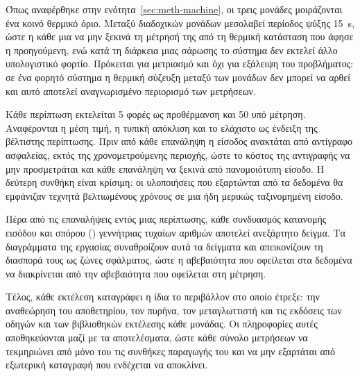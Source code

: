 Όπως αναφέρθηκε στην ενότητα~\ref{sec:meth-machine}, οι τρεις μονάδες μοιράζονται
ένα κοινό θερμικό όριο. Μεταξύ διαδοχικών μονάδων μεσολαβεί περίοδος ψύξης
\qty{15}{\second}, ώστε η κάθε μια να μην ξεκινά τη μέτρησή της από τη θερμική
κατάσταση που άφησε η προηγούμενη, ενώ κατά τη διάρκεια μιας σάρωσης το σύστημα
δεν εκτελεί άλλο υπολογιστικό φορτίο. Πρόκειται για μετριασμό και όχι για
εξάλειψη του προβλήματος: σε ένα φορητό σύστημα η θερμική σύζευξη μεταξύ των
μονάδων δεν μπορεί να αρθεί και αυτό αποτελεί αναγνωρισμένο περιορισμό των
μετρήσεων.

Κάθε περίπτωση εκτελείται 5 φορές ως προθέρμανση και 50 υπό μέτρηση. Αναφέρονται
η μέση τιμή, η τυπική απόκλιση και το ελάχιστο ως ένδειξη της βέλτιστης
περίπτωσης. Πριν από κάθε επανάληψη η είσοδος ανακτάται από αντίγραφο ασφαλείας,
εκτός της χρονομετρούμενης περιοχής, ώστε το κόστος της αντιγραφής να μην
προσμετράται και κάθε επανάληψη να ξεκινά από πανομοιότυπη είσοδο. Η δεύτερη
συνθήκη είναι κρίσιμη: οι υλοποιήσεις που εξαρτώνται από τα δεδομένα θα εμφάνιζαν
τεχνητά βελτιωμένους χρόνους σε μια ήδη μερικώς ταξινομημένη είσοδο.

Πέρα από τις επαναλήψεις εντός μιας περίπτωσης, κάθε συνδυασμός κατανομής
εισόδου και σπόρου () γεννήτριας τυχαίων αριθμών αποτελεί ανεξάρτητο δείγμα. Τα
διαγράμματα της εργασίας συναθροίζουν αυτά τα δείγματα και απεικονίζουν τη
διασπορά τους ως ζώνες σφάλματος, ώστε η αβεβαιότητα που οφείλεται στα δεδομένα
να διακρίνεται από την αβεβαιότητα που οφείλεται στη μέτρηση.

Τέλος, κάθε εκτέλεση καταγράφει η ίδια το περιβάλλον στο οποίο έτρεξε: την
αναθεώρηση του αποθετηρίου, τον πυρήνα, τον μεταγλωττιστή και τις εκδόσεις των
οδηγών και των βιβλιοθηκών εκτέλεσης κάθε μονάδας. Οι πληροφορίες αυτές
αποθηκεύονται μαζί με τα αποτελέσματα, ώστε κάθε σύνολο μετρήσεων να
τεκμηριώνει από μόνο του τις συνθήκες παραγωγής του και να μην εξαρτάται από
εξωτερική καταγραφή που ενδέχεται να αποκλίνει.
